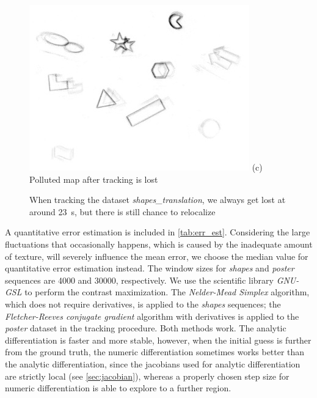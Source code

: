 \begin{enumerate}
\begin{figure}[h]
\begin{minipage}[t]{0.48\textwidth}
        \includegraphics[width = \textwidth]{images/map_956.jpg} (c)
        Polluted map after tracking is lost
      \end{minipage} \caption{When tracking the dataset
        \textit{shapes\_translation}, we always get lost at around
        \SI{23}{\second}, but there is still chance to relocalize}
      \label{fig:shapes_tr_lost}
    \end{figure}

  \end{enumerate}

  A quantitative error estimation is included in
  \cref{tab:err_est}. Considering the large fluctuations that
  occasionally happens, which is caused by the inadequate amount of
  texture, will severely influence the mean error, we choose the
  median value for quantitative error estimation instead. The window
  sizes for \textit{shapes} and \textit{poster} sequences are 4000 and
  \num{30000}, respectively. We use the scientific library
  \emph{GNU-GSL} to perform the contrast maximization. The
  \emph{Nelder-Mead Simplex} algorithm, which does not require
  derivatives, is applied to the \textit{shapes} sequences; the
  \textit{Fletcher-Reeves conjugate
    gradient}\citep{fletcher2013practical} algorithm with derivatives
  is applied to the \textit{poster} dataset in the tracking
  procedure. Both methods work. The analytic differentiation is faster
  and more stable, however, when the initial guess is further from the
  ground truth, the numeric differentiation sometimes works better
  than the analytic differentiation, since the jacobians used for
  analytic differentiation are strictly local (see
  \cref{sec:jacobian}), whereas a properly chosen step size for
  numeric differentiation is able to explore to a further region.

